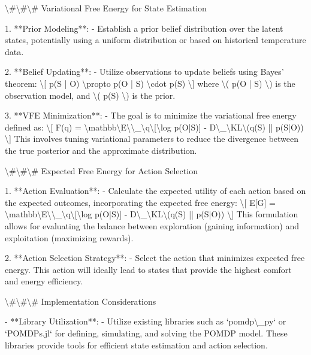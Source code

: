 \documentclass[11pt,a4paper]{article}
\begin{document}
\textbackslash{}#\textbackslash{}#\textbackslash{}# Variational Free Energy for State Estimation

1. **Prior Modeling**: 
   - Establish a prior belief distribution over the latent states, potentially using a uniform distribution or based on historical temperature data.

2. **Belief Updating**: 
   - Utilize observations to update beliefs using Bayes' theorem:
   \textbackslash{}[
   p(S | O) \textbackslash{}propto p(O | S) \textbackslash{}cdot p(S)
   \textbackslash{}]
   where \textbackslash{}( p(O | S) \textbackslash{}) is the observation model, and \textbackslash{}( p(S) \textbackslash{}) is the prior.

3. **VFE Minimization**: 
   - The goal is to minimize the variational free energy defined as:
   \textbackslash{}[
   F(q) = \textbackslash{}mathbb\textbackslash{}{E\textbackslash{}}\textbackslash{}_\textbackslash{}{q\textbackslash{}}[\textbackslash{}log p(O|S)] - D\textbackslash{}_\textbackslash{}{KL\textbackslash{}}(q(S) || p(S|O))
   \textbackslash{}]
   This involves tuning variational parameters to reduce the divergence between the true posterior and the approximate distribution.

\textbackslash{}#\textbackslash{}#\textbackslash{}# Expected Free Energy for Action Selection

1. **Action Evaluation**: 
   - Calculate the expected utility of each action based on the expected outcomes, incorporating the expected free energy:
   \textbackslash{}[
   E[G] = \textbackslash{}mathbb\textbackslash{}{E\textbackslash{}}\textbackslash{}_\textbackslash{}{q\textbackslash{}}[\textbackslash{}log p(O|S)] - D\textbackslash{}_\textbackslash{}{KL\textbackslash{}}(q(S) || p(S|O))
   \textbackslash{}]
   This formulation allows for evaluating the balance between exploration (gaining information) and exploitation (maximizing rewards).

2. **Action Selection Strategy**: 
   - Select the action that minimizes expected free energy. This action will ideally lead to states that provide the highest comfort and energy efficiency.

\textbackslash{}#\textbackslash{}#\textbackslash{}# Implementation Considerations

- **Library Utilization**: 
   - Utilize existing libraries such as `pomdp\textbackslash{}_py` or `POMDPs.jl` for defining, simulating, and solving the POMDP model. These libraries provide tools for efficient state estimation and action selection.
\end{document}
